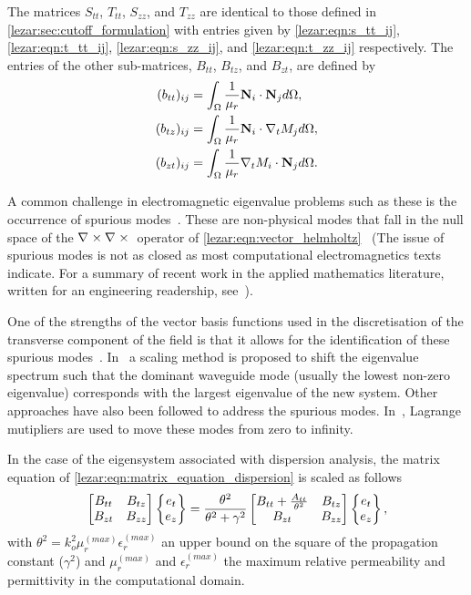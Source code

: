 The matrices $S_{tt}$, $T_{tt}$, $S_{zz}$, and $T_{zz}$ are identical
to those defined in \ref{lezar:sec:cutoff_formulation} with entries given by
\eqref{lezar:eqn:s_tt_ij}, \eqref{lezar:eqn:t_tt_ij}, \eqref{lezar:eqn:s_zz_ij}, and \eqref{lezar:eqn:t_zz_ij} respectively.
The entries of the other sub-matrices, $B_{tt}$, $B_{tz}$, and
$B_{zt}$, are defined by
\begin{align}
(b_{tt})_{ij} &=
\int_{\Omega}{\frac{1}{\mu_r}\mathbf{N}_i\cdot\mathbf{N}_j}{d\Omega},\\
(b_{tz})_{ij} &=
\int_{\Omega}{\frac{1}{\mu_r}\mathbf{N}_i\cdot\nabla_t{M_j}}{d\Omega},\\
(b_{zt})_{ij} &=
\int_{\Omega}{\frac{1}{\mu_r}\nabla_t{M_i}\cdot\mathbf{N}_j}{d\Omega}.
\end{align}

A common challenge in electromagnetic eigenvalue problems such as
these is the occurrence of spurious
modes~\cite{Davidson2005}.  These are non-physical
modes that fall in the null space of the $\nabla_{} \times {\nabla_{} \times {}}$ operator
of \eqref{lezar:eqn:vector_helmholtz}~\cite{Bossavit1998} (The issue of spurious
modes is not as closed as most computational electromagnetics texts
indicate. For a summary of recent work in the applied mathematics
literature, written for an engineering readership,
see~\cite{FernandesRaffetto2002}).

One of the strengths of the vector basis functions used in the
discretisation of the transverse component of the field is that it
allows for the identification of these spurious modes~\cite{Davidson2005,
Jin2002}.  In~\cite{LeeSunCendes1991} a scaling method is proposed to shift
the eigenvalue spectrum such that the dominant waveguide mode (usually
the lowest non-zero eigenvalue) corresponds with the largest
eigenvalue of the new system. Other approaches have also been followed
to address the spurious modes. In~\cite{VardapetyanDemkowicz2002}, Lagrange
mutipliers are used to move these modes from zero to infinity.

In the case of the eigensystem associated with dispersion analysis,
the matrix equation of \eqref{lezar:eqn:matrix_equation_dispersion} is
scaled as follows
\begin{equation}
    \label{lezar:eqn:matrix_equation_dispersion_scaled}
    \begin{bmatrix} B_{tt} & B_{tz}\\B_{zt} & B_{zz}\end{bmatrix}\begin{Bmatrix}e_t\\e_z\end{Bmatrix} =
    \frac{\theta^2}{\theta^2 +
    \gamma^2}\begin{bmatrix} B_{tt} +
    \frac{A_{tt}}{\theta^2} & B_{tz}\\B_{zt} & B_{zz}\end{bmatrix}\begin{Bmatrix}e_t\\e_z\end{Bmatrix},
\end{equation}
with $\theta^2 = k_o^2\mu_r^{(max)}\epsilon_r^{(max)}$ an upper bound on
the square of the propagation constant ($\gamma^2$) and $\mu_r^{(max)}$
and $\epsilon_r^{(max)}$ the maximum relative permeability and permittivity
in the computational domain.

